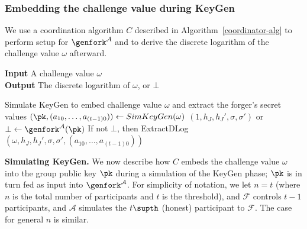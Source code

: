 
\subsubsection{Embedding the challenge value during KeyGen}
\label{embedding-chal}

We use a coordination
algorithm $C$ described in Algorithm~\ref{coordinator-alg}
to perform setup for $\genfork^\mathcal{A}$ and to derive the discrete logarithm
of the challenge value $\omega$ afterward.

    \begin{algorithm}[t]
        \caption{Algorithm $C(\omega)$}
    \label{coordinator-alg}
         \hspace*{\algorithmicindent} \textbf{Input} A challenge value $\omega$ \\
         \hspace*{\algorithmicindent} \textbf{Output} The discrete logarithm of
         $\omega$, or $\bot$ \\
        \begin{algorithmic}[1]
          \STATE Simulate KeyGen to embed challenge value $\omega$ and extract the
          forger's secret values
          $(\pk, (a_{10}, \dots, a_{(t-1)0})) \leftarrow SimKeyGen(\omega)$
          \STATE $(1, h_J, h_J', \sigma, \sigma')$ or $\bot \leftarrow \genfork^\mathcal{A}(\pk)$
          \STATE If not $\bot$, then ExtractDLog$(\omega, h_J, h_J', \sigma, \sigma',
          (a_{10}, \dots, a_{(t-1)0}))$
        \end{algorithmic}
    \end{algorithm}


\textbf{Simulating KeyGen.}
We now describe how $C$ embeds the challenge value $\omega$ into the group public
key $\pk$ during a simulation of the KeyGen phase; $\pk$ is in turn fed as input
into $\genfork^\mathcal{A}$. For simplicity of notation, we
let $n=t$ (where $n$ is the total number of participants and $t$ is the
threshold), and $\mathcal{F}$ controls $t-1$ participants, and
$\mathcal{A}$ simulates the $t\supth$ (honest) participant to $\mathcal{F}$.
The case for general $n$ is similar.

